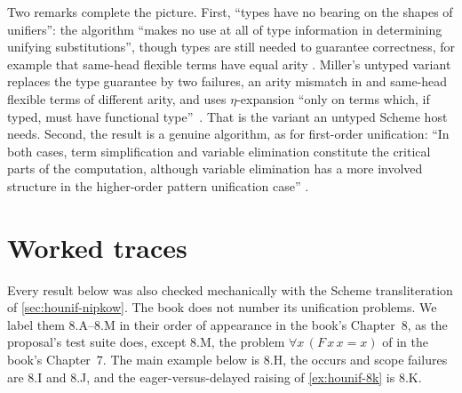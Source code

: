 Two remarks complete the picture. First, \enquote{types have no bearing on the shapes of unifiers}: the
algorithm \enquote{makes no use at all of type information in determining unifying substitutions}, though types are
still needed to guarantee correctness, for example that same-head flexible terms have equal arity .
Miller's untyped variant replaces the type guarantee by two failures, an arity mismatch in  and
same-head flexible terms of different arity, and uses $\eta$-expansion \enquote{only on terms which, if typed, must
have functional type}~\cite[\S9.3]{Miller1991}. That is the variant an untyped Scheme host needs. Second, the
result is a genuine algorithm, as for first-order unification: \enquote{In both cases, term simplification and
variable elimination constitute the critical parts of the computation, although variable elimination has a more
involved structure in the higher-order pattern unification case} .

\section{Worked traces}\label{sec:hounif-traces}

Every result below was also checked mechanically with the Scheme transliteration of \cref{sec:hounif-nipkow}.
The book does not number its unification problems. We label them 8.A--8.M in their order of appearance in
the book's Chapter~8, as the proposal's test suite does, except 8.M, the problem $\forall x\,(F\,x\,x=x)$ of
 in the book's Chapter~7. The main example below is 8.H, the occurs and scope failures are 8.I
and 8.J, and the eager-versus-delayed raising of \cref{ex:hounif-8k} is 8.K.

